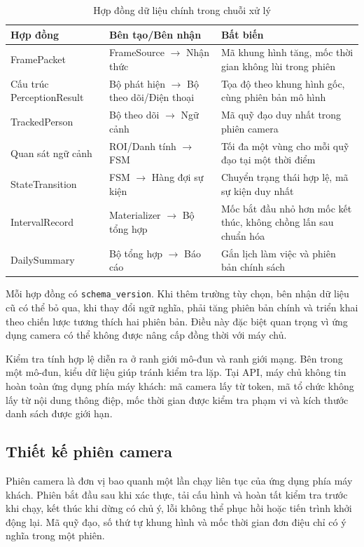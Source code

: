 \begin{table}[H]
\centering
\caption{Hợp đồng dữ liệu chính trong chuỗi xử lý}
\label{tab:pipeline-contracts}
\begin{tabularx}{\textwidth}{p{3.2cm}p{4cm}X}
\toprule
\textbf{Hợp đồng} & \textbf{Bên tạo/Bên nhận} & \textbf{Bất biến}\\
\midrule
FramePacket & FrameSource $\rightarrow$ Nhận thức & Mã khung hình tăng, mốc thời gian không lùi trong phiên\\
Cấu trúc PerceptionResult & Bộ phát hiện $\rightarrow$ Bộ theo dõi/Điện thoại & Tọa độ theo khung hình gốc, cùng phiên bản mô hình\\
TrackedPerson & Bộ theo dõi $\rightarrow$ Ngữ cảnh & Mã quỹ đạo duy nhất trong phiên camera\\
Quan sát ngữ cảnh & ROI/Danh tính $\rightarrow$ FSM & Tối đa một vùng cho mỗi quỹ đạo tại một thời điểm\\
StateTransition & FSM $\rightarrow$ Hàng đợi sự kiện & Chuyển trạng thái hợp lệ, mã sự kiện duy nhất\\
IntervalRecord & Materializer $\rightarrow$ Bộ tổng hợp & Mốc bắt đầu nhỏ hơn mốc kết thúc, không chồng lấn sau chuẩn hóa\\
DailySummary & Bộ tổng hợp $\rightarrow$ Báo cáo & Gắn lịch làm việc và phiên bản chính sách\\
\bottomrule
\end{tabularx}
\end{table}

Mỗi hợp đồng có \texttt{schema\_version}. Khi thêm trường tùy chọn, bên nhận dữ liệu cũ có thể bỏ qua, khi thay đổi ngữ nghĩa, phải tăng phiên bản chính và triển khai theo chiến lược tương thích hai phiên bản. Điều này đặc biệt quan trọng vì ứng dụng camera có thể không được nâng cấp đồng thời với máy chủ.

Kiểm tra tính hợp lệ diễn ra ở ranh giới mô-đun và ranh giới mạng. Bên trong một mô-đun, kiểu dữ liệu giúp tránh kiểm tra lặp. Tại API, máy chủ không tin hoàn toàn ứng dụng phía máy khách: mã camera lấy từ token, mã tổ chức không lấy từ nội dung thông điệp, mốc thời gian được kiểm tra phạm vi và kích thước danh sách được giới hạn.

\subsection{Thiết kế phiên camera}
Phiên camera là đơn vị bao quanh một lần chạy liên tục của ứng dụng phía máy khách. Phiên bắt đầu sau khi xác thực, tải cấu hình và hoàn tất kiểm tra trước khi chạy, kết thúc khi dừng có chủ ý, lỗi không thể phục hồi hoặc tiến trình khởi động lại. Mã quỹ đạo, số thứ tự khung hình và mốc thời gian đơn điệu chỉ có ý nghĩa trong một phiên.

